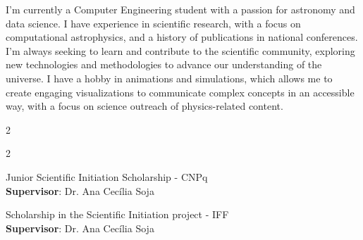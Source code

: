 \begin{fullwidth}
  


I'm currently a Computer Engineering student with a passion for astronomy and data science. I have experience in scientific research, with a focus on computational astrophysics, and a history of publications in national conferences. I'm always seeking to learn and contribute to the scientific community, exploring new technologies and methodologies to advance our understanding of the universe. I have a hobby in animations and simulations, which allows me to create engaging visualizations to communicate complex concepts in an accessible way, with a focus on science outreach of physics-related content.

\medskip


\begin{multicols}{2}

\columnbreak

\end{multicols}

\smallskip


\begin{multicols}{2}

Junior Scientific Initiation Scholarship - CNPq \\
\textbf{Supervisor}: Dr. Ana Cecília Soja

\divider

Scholarship in the Scientific Initiation project - IFF \\
\textbf{Supervisor}: Dr. Ana Cecília Soja

\columnbreak


\end{multicols}
\end{fullwidth}

